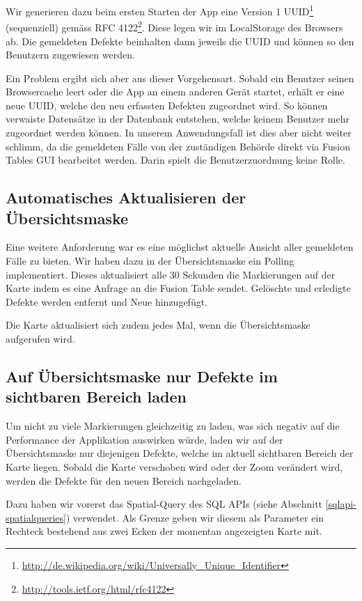 Wir generieren dazu beim ersten Starten der App eine Version 1 UUID\footnote{\url{http://de.wikipedia.org/wiki/Universally_Unique_Identifier}} (sequenziell) gemäss RFC 4122\footnote{\url{http://tools.ietf.org/html/rfc4122}}. Diese legen wir im LocalStorage des Browsers ab. Die gemeldeten Defekte beinhalten dann jeweils die UUID und können so den Benutzern zugewiesen werden.

Ein Problem ergibt sich aber aus dieser Vorgehensart. Sobald ein Benutzer seinen Browsercache leert oder die App an einem anderen Gerät startet, erhält er eine neue UUID, welche den neu erfassten Defekten zugeordnet wird. So können verwaiste Datensätze in der Datenbank entstehen, welche keinem Benutzer mehr zugeordnet werden können. In unserem Anwendungsfall ist dies aber nicht weiter schlimm, da die gemeldeten Fälle von der zuständigen Behörde direkt via Fusion Tables GUI bearbeitet werden. Darin spielt die Benutzerzuordnung keine Rolle.

\subsection{Automatisches Aktualisieren der Übersichtsmaske}
\label{fixmystreet-polling}
Eine weitere Anforderung war es eine möglichst aktuelle Ansicht aller gemeldeten Fälle zu bieten. Wir haben dazu in der Übersichtsmaske ein Polling implementiert. Dieses aktualisiert alle 30 Sekunden die Markierungen auf der Karte indem es eine Anfrage an die Fusion Table sendet. Gelöschte und erledigte Defekte werden entfernt und Neue hinzugefügt.

Die Karte aktualisiert sich zudem jedes Mal, wenn die Übersichtsmaske aufgerufen wird.

\subsection{Auf Übersichtsmaske nur Defekte im sichtbaren Bereich laden}
Um nicht zu viele Markierungen gleichzeitig zu laden, was sich negativ auf die Performance der Applikation auswirken würde, laden wir auf der Übersichtsmaske nur diejenigen Defekte, welche im aktuell sichtbaren Bereich der Karte liegen. Sobald die Karte verschoben wird oder der Zoom verändert wird, werden die Defekte für den neuen Bereich nachgeladen.

Dazu haben wir vorerst das Spatial-Query  des SQL APIs (siehe Abschnitt \ref{sqlapi-spatialqueries}) verwendet. Als Grenze geben wir diesem als Parameter ein Rechteck bestehend aus zwei Ecken der momentan angezeigten Karte mit.

